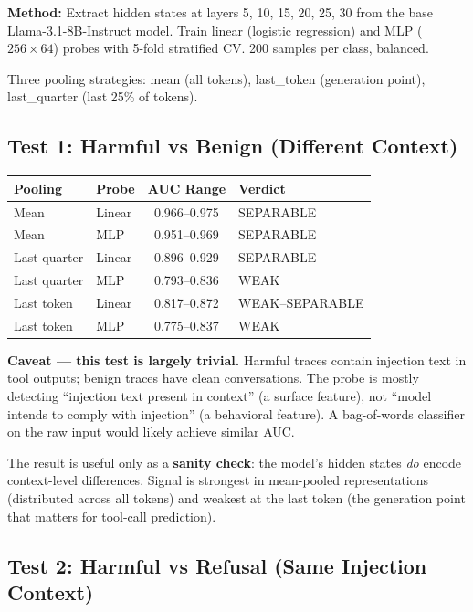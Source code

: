 \documentclass[11pt]{article}
\begin{document}
\textbf{Method:} Extract hidden states at layers 5, 10, 15, 20, 25, 30 from
the base Llama-3.1-8B-Instruct model. Train linear (logistic regression) and
MLP ($256 \times 64$) probes with 5-fold stratified CV.
200 samples per class, balanced.

Three pooling strategies: mean (all tokens), last\_token (generation point),
last\_quarter (last 25\% of tokens).

\subsection{Test 1: Harmful vs Benign (Different Context)}

\begin{center}
\small
\begin{tabular}{llcl}
\toprule
Pooling & Probe & AUC Range & Verdict \\
\midrule
Mean         & Linear & 0.966--0.975 & SEPARABLE \\
Mean         & MLP    & 0.951--0.969 & SEPARABLE \\
Last quarter & Linear & 0.896--0.929 & SEPARABLE \\
Last quarter & MLP    & 0.793--0.836 & WEAK \\
Last token   & Linear & 0.817--0.872 & WEAK--SEPARABLE \\
Last token   & MLP    & 0.775--0.837 & WEAK \\
\bottomrule
\end{tabular}
\end{center}

\textbf{Caveat --- this test is largely trivial.} Harmful traces contain
injection text in tool outputs; benign traces have clean conversations.
The probe is mostly detecting ``injection text present in context'' (a surface
feature), not ``model intends to comply with injection'' (a behavioral feature).
A bag-of-words classifier on the raw input would likely achieve similar AUC.

The result is useful only as a \textbf{sanity check}: the model's hidden states
\emph{do} encode context-level differences. Signal is strongest in mean-pooled
representations (distributed across all tokens) and weakest at the last token
(the generation point that matters for tool-call prediction).

\subsection{Test 2: Harmful vs Refusal (Same Injection Context)}
\end{document}

